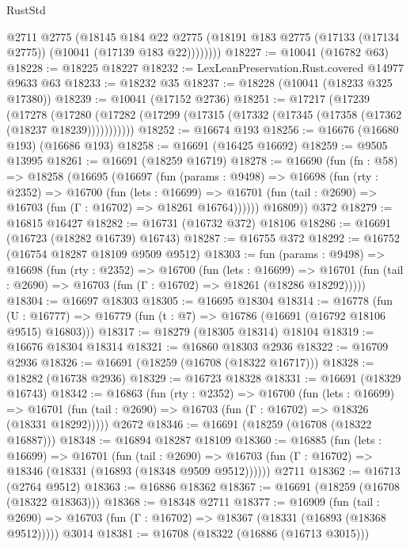 \begin{lexlean}{RustStd}
\begin{coremodule}
            @2711
            @2775
            (@18145
              @184
              @22
              @2775
              (@18191 @183 @2775 (@17133 (@17134 @2775)) (@10041 (@17139 @183 @22))))))))
@18227 := @10041 (@16782 @63)
@18228 := @18225 @18227
@18232 := LexLeanPreservation.Rust.covered @14977 @9633 @63
@18233 := @18232 @35
@18237 := @18228 (@10041 (@18233 @325 @17380))
@18239 := @10041 (@17152 @2736)
@18251 := @17217
    (@17239
      (@17278
        (@17280 (@17282 (@17299 (@17315 (@17332 (@17345 (@17358 (@17362 (@18237 @18239)))))))))))
@18252 := @16674 @193
@18256 := @16676 (@16680 @193) (@16686 @193)
@18258 := @16691 (@16425 @16692)
@18259 := @9505 @13995
@18261 := @16691 (@18259 @16719)
@18278 := @16690
    (fun (fn : @58) =>
    @18258
      (@16695
        (@16697
          (fun (params : @9498) =>
          @16698
            (fun (rty : @2352) =>
            @16700
              (fun (lets : @16699) =>
              @16701 (fun (tail : @2690) => @16703 (fun (Γ : @16702) => @18261 @16764))))))
        @16809))
    @372
@18279 := @16815 @16427
@18282 := @16731 (@16732 @372) @18106
@18286 := @16691 (@16723 (@18282 @16739) @16743)
@18287 := @16755 @372
@18292 := @16752 (@16754 @18287 @18109 @9509 @9512)
@18303 := fun (params : @9498) =>
  @16698
    (fun (rty : @2352) =>
    @16700
      (fun (lets : @16699) =>
      @16701 (fun (tail : @2690) => @16703 (fun (Γ : @16702) => @18261 (@18286 @18292)))))
@18304 := @16697 @18303
@18305 := @16695 @18304
@18314 := @16778
    (fun (U : @16777) => @16779 (fun (t : @7) => @16786 (@16691 (@16792 @18106 @9515) @16803)))
@18317 := @18279 (@18305 @18314) @18104
@18319 := @16676 @18304 @18314
@18321 := @16860 @18303 @2936
@18322 := @16709 @2936
@18326 := @16691 (@18259 (@16708 (@18322 @16717)))
@18328 := @18282 (@16738 @2936)
@18329 := @16723 @18328
@18331 := @16691 (@18329 @16743)
@18342 := @16863
    (fun (rty : @2352) =>
    @16700
      (fun (lets : @16699) =>
      @16701 (fun (tail : @2690) => @16703 (fun (Γ : @16702) => @18326 (@18331 @18292)))))
    @2672
@18346 := @16691 (@18259 (@16708 (@18322 @16887)))
@18348 := @16894 @18287 @18109
@18360 := @16885
    (fun (lets : @16699) =>
    @16701
      (fun (tail : @2690) =>
      @16703 (fun (Γ : @16702) => @18346 (@18331 (@16893 (@18348 @9509 @9512))))))
    @2711
@18362 := @16713 (@2764 @9512)
@18363 := @16886 @18362
@18367 := @16691 (@18259 (@16708 (@18322 @18363)))
@18368 := @18348 @2711
@18377 := @16909
    (fun (tail : @2690) => @16703 (fun (Γ : @16702) => @18367 (@18331 (@16893 (@18368 @9512)))))
    @3014
@18381 := @16708 (@18322 (@16886 (@16713 @3015)))

\end{coremodule}
\end{lexlean}
